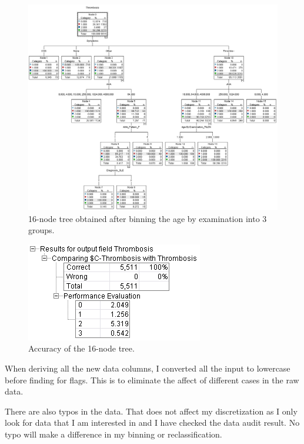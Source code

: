 \documentclass[12pt]{article}
\begin{document}
\begin{figure}[!ht]
\begin{center}
\includegraphics[width=\textwidth]{fig/tree_age_3bin.png}
\caption{16-node tree obtained after binning the age by examination into 3 groups.}
\label{fig:tree_age_3bin}
\end{center}
\end{figure}

\begin{figure}[!hb]
\begin{center}
\includegraphics[scale=1]{fig/accu_age_3bin.png}
\caption{Accuracy of the 16-node tree.}
\label{fig:accu_age_3bin}
\end{center}
\end{figure}

When deriving all the new data columns, I converted all the input to lowercase before finding for flags. This is to eliminate the affect of different cases in the raw data.

There are also typos in the data. That does not affect my discretization as I only look for data that I am interested in and I have checked the data audit result. No typo will make a difference in my binning or reclassification.
\end{document}
